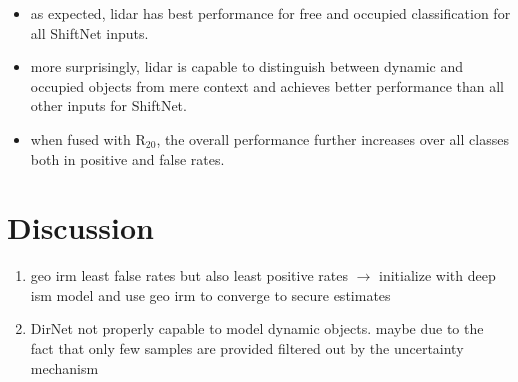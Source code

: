 \begin{itemize}
	\item as expected, lidar has best performance for free and occupied classification for all ShiftNet inputs.
	\item more surprisingly, lidar is capable to distinguish between dynamic and occupied objects from mere context and achieves better performance than all other inputs for ShiftNet. 
	\item when fused with R$_{20}$, the overall performance further increases over all classes both in positive and false rates.
\end{itemize}
%
\section{Discussion}
\label{sec:deep_ism_discussion}
\begin{enumerate}
	\item geo \gls{irm} least false rates but also least positive rates $\rightarrow$ initialize with deep \gls{ism} model and use geo \gls{irm} to converge to secure estimates
	\item DirNet not properly capable to model dynamic objects. maybe due to the fact that only few samples are provided filtered out by the uncertainty mechanism
\end{enumerate}